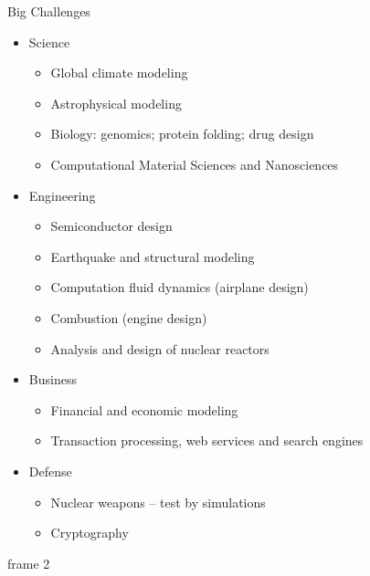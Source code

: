 \documentclass[xcolor=x11names,compress]{beamer}
\renewcommand{\(}{\begin{columns}}
\renewcommand{\)}{\end{columns}}
\newcommand{\<}[1]{\begin{column}{#1}}
\renewcommand{\>}{\end{column}}
\begin{document}
\begin{frame}{Big Challenges}
\begin{itemize}
\item Science
\begin{itemize}
\item Global climate modeling
\item Astrophysical modeling
\item Biology: genomics; protein folding; drug design
\item Computational Material Sciences and Nanosciences
\end{itemize}
\item Engineering
\begin{itemize}
\item Semiconductor design
\item Earthquake and structural modeling
\item Computation fluid dynamics (airplane design)
\item Combustion (engine design)
\item Analysis and design of nuclear reactors
\end{itemize}
\item Business
\begin{itemize}
\item Financial and economic modeling
\item Transaction processing, web services and search engines
\end{itemize}
\item Defense
\begin{itemize}
\item Nuclear weapons -- test by simulations
\item Cryptography
\end{itemize}
\end{itemize}
\end{frame}

\begin{frame}{frame 2}

\end{frame}
\end{document}
